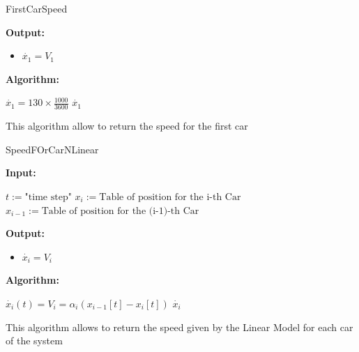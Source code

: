 \documentclass{article}
\begin{document}
			\begin{algorithm}[H]
				\caption{FirstCarSpeed}\label{alg:x1_dot}
				\begin{algorithmic}
					\State \textbf{Output:} \\
					\begin{itemize}[]
						\item $\dot{x_1}=V_1$
					\end{itemize}
					\State \textbf{Algorithm:} \\
					\begin{itemize}[]
						\State $\dot{x_1}=130 \times \frac{1000}{3600}$ 
						\State \Return $\dot{x_1}$ 
					\end{itemize}		
				\end{algorithmic}
			\end{algorithm}
			This algorithm allow to return the speed for the first car
			\begin{algorithm}[H]
				\caption{SpeedFOrCarNLinear}\label{alg:xi_dot}
				\begin{algorithmic}
					\State \textbf{Input:} \\
					\begin{itemize}
					\State $t:=\text{"time  step"}$
					\State$x_i:=\text{Table of position for the i-th Car}$
					\State$x_{i-1}:=\text{Table of position for the (i-1)-th Car}$
					\end{itemize}
					\State \textbf{Output:} \\
					\begin{itemize}[]
						\item $\dot{x_i}=V_i$
					\end{itemize}
					\State \textbf{Algorithm:} \\
					\begin{itemize}[]
						\State $\dot{x_i}(t) = V_i = \alpha_i(x_{i-1}[t] - x_i[t])$ 
						\State \Return $\dot{x_i}$ 
					\end{itemize}		
				\end{algorithmic}
			\end{algorithm}
			
			This algorithm allows to return the speed given by the Linear Model for each car of the system
			
\end{document}
